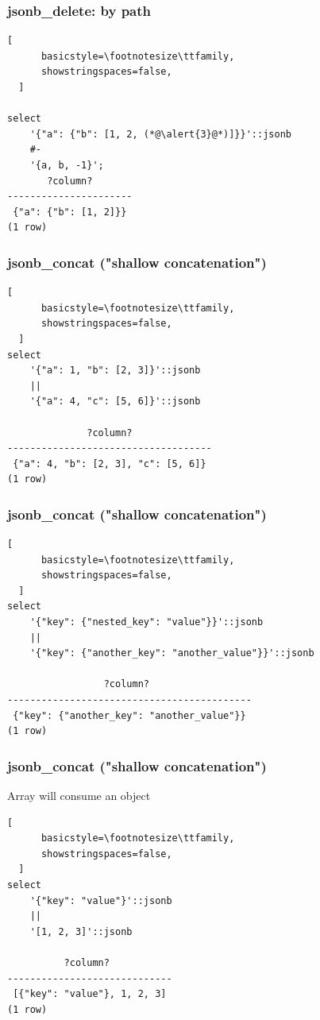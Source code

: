 \documentclass[14pt, compress]{beamer}
\begin{document}
\begin{frame}[fragile]
  \frametitle{jsonb\_delete: by path}

  \begin{lstlisting}[
      basicstyle=\footnotesize\ttfamily,
      showstringspaces=false,
  ]

select 
    '{"a": {"b": [1, 2, (*@\alert{3}@*)]}}'::jsonb
    #-
    '{a, b, -1}';
       ?column?       
----------------------
 {"a": {"b": [1, 2]}}
(1 row)

  \end{lstlisting}
\end{frame}

\begin{frame}[fragile]
\frametitle{jsonb\_concat ("shallow concatenation")}

  \begin{lstlisting}[
      basicstyle=\footnotesize\ttfamily,
      showstringspaces=false,
  ]
select 
    '{"a": 1, "b": [2, 3]}'::jsonb
    ||
    '{"a": 4, "c": [5, 6]}'::jsonb

              ?column?              
------------------------------------
 {"a": 4, "b": [2, 3], "c": [5, 6]}
(1 row)

  \end{lstlisting}
\end{frame}

\begin{frame}[fragile]
\frametitle{jsonb\_concat ("shallow concatenation")}

  \begin{lstlisting}[
      basicstyle=\footnotesize\ttfamily,
      showstringspaces=false,
  ]
select 
    '{"key": {"nested_key": "value"}}'::jsonb
    ||
    '{"key": {"another_key": "another_value"}}'::jsonb

                 ?column?                  
-------------------------------------------
 {"key": {"another_key": "another_value"}}
(1 row)

  \end{lstlisting}
\end{frame}

\begin{frame}[fragile]
\frametitle{jsonb\_concat ("shallow concatenation")}
    Array will consume an object
  \begin{lstlisting}[
      basicstyle=\footnotesize\ttfamily,
      showstringspaces=false,
  ]
select 
    '{"key": "value"}'::jsonb
    ||
    '[1, 2, 3]'::jsonb 

          ?column?           
-----------------------------
 [{"key": "value"}, 1, 2, 3]
(1 row)

  \end{lstlisting}
\end{frame}
\end{document}
